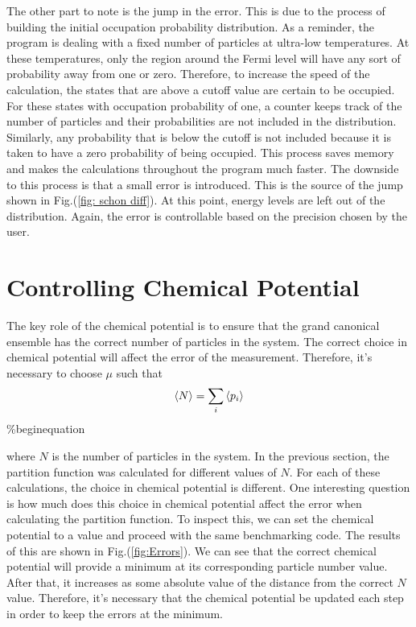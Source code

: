 The other part to note is the jump in the error. This is due to the process of building the initial occupation probability distribution. As a reminder, the program is dealing with a fixed number of particles at ultra-low temperatures. At these temperatures, only the region around the Fermi level will have any sort of probability away from one or zero. Therefore, to increase the speed of the calculation, the states that are above a cutoff value are certain to be occupied. For these states with occupation probability of one, a counter keeps track of the number of particles and their probabilities are not included in the distribution. Similarly, any probability that is below the cutoff is not included because it is taken to have a zero probability of being occupied. This process saves memory and makes the calculations throughout the program much faster. The downside to this process is that a small error is introduced. This is the source of the jump shown in Fig.\@ (\ref{fig: schon diff}). At this point, energy levels are left out of the distribution. Again, the error is controllable based on the precision chosen by the user.

\section{Controlling Chemical Potential}
The key role of the chemical potential is to ensure that the grand canonical ensemble has the correct number of particles in the system. The correct choice in chemical potential will affect the error of the measurement. Therefore, it's necessary to choose $\mu$ such that 
\begin{equation}
    \left<{N}\right>=\sum_i \left<{p_i}\right>
\end{equation}
\%begin{equation}

where $N$ is the number of particles in the system. In the previous section, the partition function was calculated for different values of $N$. For each of these calculations, the choice in chemical potential is different. One interesting question is how much does this choice in chemical potential affect the error when calculating the partition function. To inspect this, we can set the chemical potential to a value and proceed with the same benchmarking code. The results of this are shown in Fig.\@ (\ref{fig:Errors}). We can see that the correct chemical potential will provide a minimum at its corresponding particle number value. After that, it increases as some absolute value of the distance from the correct $N$ value. Therefore, it's necessary that the chemical potential be updated each step in order to keep the errors at the minimum. 

